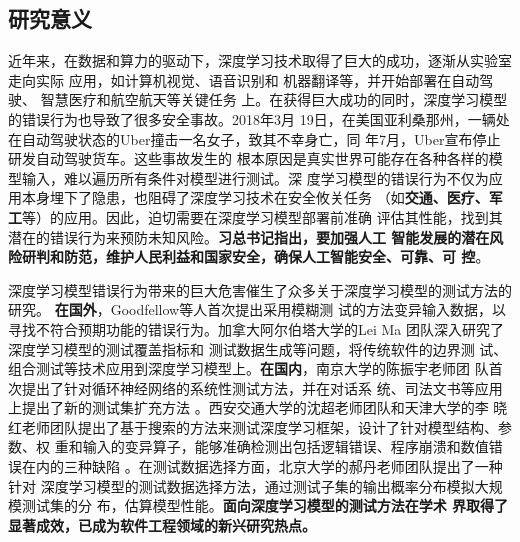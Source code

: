 
\subsection{研究意义}



%
近年来，在数据和算力的驱动下，深度学习技术取得了巨大的成功，逐渐从实验室走向实际
应用，如计算机视觉、语音识别和
机器翻译等，并开始部署在自动驾驶、
智慧医疗和航空航天等关键任务
上。在获得巨大成功的同时，深度学习模型的错误行为也导致了很多安全事故。2018年3月
19日，在美国亚利桑那州，一辆处在自动驾驶状态的Uber撞击一名女子，致其不幸身亡，同
年7月，Uber宣布停止研发自动驾驶货车\textsuperscript{\cite{Uber}}。这些事故发生的
根本原因是真实世界可能存在各种各样的模型输入，难以遍历所有条件对模型进行测试。深
度学习模型的错误行为不仅为应用本身埋下了隐患，也阻碍了深度学习技术在安全攸关任务
（如\textbf{交通、医疗、军工}等）的应用。因此，{迫切需要在深度学习模型部署前准确
评估其性能，找到其潜在的错误行为来预防未知风险}。\textbf{习总书记指出，要加强人工
智能发展的潜在风险研判和防范，维护人民利益和国家安全，确保人工智能安全、可靠、可
控}。





深度学习模型错误行为带来的巨大危害催生了众多关于深度学习模型的测试方法的研究。
\textbf{在国外}，Goodfellow等人首次提出采用模糊测
试的方法变异输入数据，以寻找不符合预期功能的错误行为。加拿大阿尔伯塔大学的Lei Ma
团队深入研究了深度学习模型的测试覆盖指标和
测试数据生成等问题，将传统软件的边界测
试、组合测试等技术应用到深度学习模型上。\textbf{在国内}，南京大学的陈振宇老师团
队首次提出了针对循环神经网络的系统性测试方法，并在对话系
统、司法文书等应用上提出了新的测试集扩充方法
。西安交通大学的沈超老师团队和天津大学的李
晓红老师团队提出了基于搜索的方法来测试深度学习框架，设计了针对模型结构、参数、权
重和输入的变异算子，能够准确检测出包括逻辑错误、程序崩溃和数值错误在内的三种缺陷
。在测试数据选择方面，北京大学的郝丹老师团队提出了一种针对
深度学习模型的测试数据选择方法，通过测试子集的输出概率分布模拟大规模测试集的分
布，估算模型性能。\textbf{面向深度学习模型的测试方法在学术
界取得了显著成效，已成为软件工程领域的新兴研究热点。}

